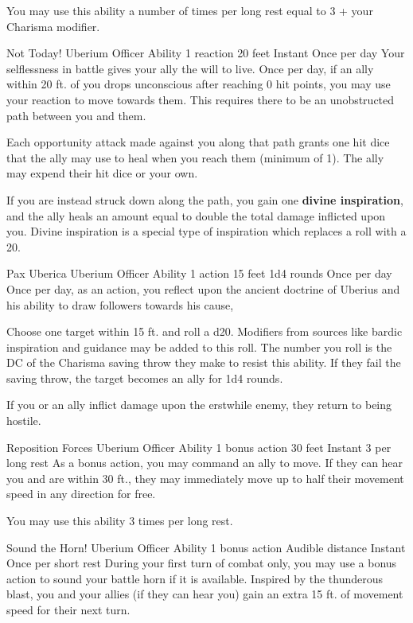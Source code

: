 You may use this ability a number of times per long rest
equal to 3 + your Charisma modifier.


\ability%
    {Not Today!}
    {Uberium Officer Ability}
    {1 reaction}
    {20 feet}
    {Instant}
    {Once per day}
Your selflessness in battle gives your ally the will to live.
Once per day, if an ally within 20 ft. of you drops unconscious
after reaching 0 hit points, you may use your reaction
to move towards them.
This requires there to be an unobstructed path between you and them.

Each opportunity attack made against you along that path
grants one hit dice that the ally may use to heal
when you reach them (minimum of 1).
The ally may expend their hit dice or your own.

If you are instead struck down along the path,
you gain one \textbf{divine inspiration},
and the ally heals an amount equal to
double the total damage inflicted upon you.
Divine inspiration is a special type of inspiration
which replaces a roll with a 20.


\ability%
    {Pax Uberica}
    {Uberium Officer Ability}
    {1 action}
    {15 feet}
    {1d4 rounds}
    {Once per day}
Once per day, as an action,
you reflect upon the ancient doctrine of Uberius
and his ability to draw followers towards his cause,

Choose one target within 15 ft. and roll a d20.
Modifiers from sources like bardic inspiration and guidance
may be added to this roll.
The number you roll is the DC of the Charisma saving throw
they make to resist this ability.
If they fail the saving throw,
the target becomes an ally for 1d4 rounds.

If you or an ally inflict damage upon the erstwhile enemy,
they return to being hostile.


\ability%
    {Reposition Forces}
    {Uberium Officer Ability}
    {1 bonus action}
    {30 feet}
    {Instant}
    {3 per long rest}
As a bonus action, you may command an ally to move.
If they can hear you and are within 30 ft.,
they may immediately move up to half their movement speed
in any direction for free.

You may use this ability 3 times per long rest.


\ability%
    {Sound the Horn!}
    {Uberium Officer Ability}
    {1 bonus action}
    {Audible distance}
    {Instant}
    {Once per short rest}
During your first turn of combat only,
you may use a bonus action to sound your battle horn
if it is available.
Inspired by the thunderous blast,
you and your allies (if they can hear you)
gain an extra 15 ft. of movement speed
for their next turn.

